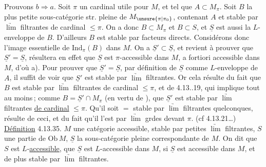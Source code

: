 Prouvons $b\Longrightarrow a$. Soit $\pi$ un cardinal utile pour $M$, et tel que $A\subset M_\pi$. Soit $B$ la plus petite sous-catégorie str. pleine de $M_{\unsure{\pi|\pi_0}}$,  contenant $A$ et stable par $\underrightarrow{\lim}$ filtrantes de cardinal $\leq\pi$. On a donc $B\subset M_\pi$ et $B\subset S$,  et $\underline S$ est aussi la $L$-enveloppe de $B$. D'ailleurs $B$ est stable par
facteurs directs. Considérons donc l'image essentielle  de $\mathrm{Ind}_\pi(B)$ dans $M$. On a $\underline S'\subset\underline S$, et  revient à prouver que $\underline S'=\underline S$,   résultera en effet que $\underline S$ est $\pi$-accessible dans $M$, a fortiori accessible dans $M$, d'où a). Pour prouver que $\underline S'=\underline S$, par définition de $\underline S$ comme  $L$-enveloppe de $A$, il suffit de voir que $\underline S'$ est stable par  $\underrightarrow{\lim}$ filtrantes. Or cela résulte du fait que $B$  est stable  par  $\underrightarrow{\lim}$ filtrantes de cardinal $\leq\pi$, et de 4.13..19, qui implique tout au moins\,;  comme $B=\underline S'\cap M_\pi$ (en vertu de ), que $\underline S'$ est stable par $\underrightarrow{\lim}$ filtrantes \uline{de cardinal} $\leq\pi$. Qu'il soit $=$ stable par  $\underrightarrow{\lim}$ filtrantes quelconques, résulte de ceci, et du fait qu'il l'est par $\underrightarrow{\lim}$ grdes devant $\pi$. (cf 4.13.21\ldots)
\uline{Définition} 4.13.35.  $M$ une catégorie accessible, stable par petites $\underrightarrow{\lim}$ filtrantes,  $S$ une partie de $\mathrm{Ob}\,M$, $\underline S$ la sous-catégorie  pleine correspondante de $M$. On dit que $S$ est $L$-\uline{accessible},  que $\underline S$ est $L$-accessible dans $M$, si $\underline S$ est accessible dans $M$, et de plus stable par  $\underrightarrow{\lim}$ filtrantes.


